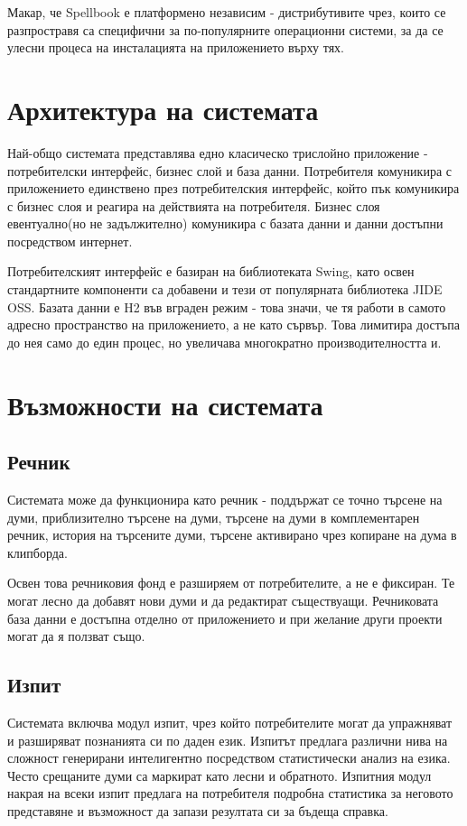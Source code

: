 Макар, че Spellbook е платформено независим - дистрибутивите чрез,
които се разпростравя са специфични за по-популярните операционни
системи, за да се улесни процеса на инсталацията на приложението върху
тях.  
\section{Архитектура на системата}
Най-общо системата представлява едно класическо трислойно приложение -
потребителски интерфейс, бизнес слой и база данни. Потребителя
комуникира с приложението единствено през потребителския интерфейс,
който пък комуникира с бизнес слоя и реагира на действията на
потребителя. Бизнес слоя евентуално(но не задължително) комуникира с
базата данни и данни достъпни посредством интернет.

Потребителският интерфейс е базиран на библиотеката Swing, като освен
стандартните компоненти са добавени и тези от популярната библиотека
JIDE OSS. Базата данни е H2 във вграден режим - това значи, че тя
работи в самото адресно пространство на приложението, а не като
сървър. Това лимитира достъпа до нея само до един процес, но увеличава
многократно производителността и.


\section{Възможности на системата}
\subsection{Речник}
Системата може да функционира като речник - поддържат се точно търсене
на думи, приблизително търсене на думи, търсене на думи в
комплементарен речник, история на търсените думи, търсене активирано
чрез копиране на дума в клипборда. 

Освен това речниковия фонд е разширяем от потребителите, а не е
фиксиран. Те могат лесно да добавят нови думи и да редактират
съществуащи. Речниковата база данни е достъпна отделно от приложението
и при желание други проекти могат да я ползват също.
\subsection{Изпит}
Системата включва модул изпит, чрез който потребителите могат да
упражняват и разширяват познанията си по даден език. Изпитът предлага
различни нива на сложност генерирани интелигентно посредством
статистически анализ на езика. Често срещаните думи са маркират като
лесни и обратното. Изпитния модул накрая на всеки изпит предлага на
потребителя подробна статистика за неговото представяне и възможност
да запази резултата си за бъдеща справка.
